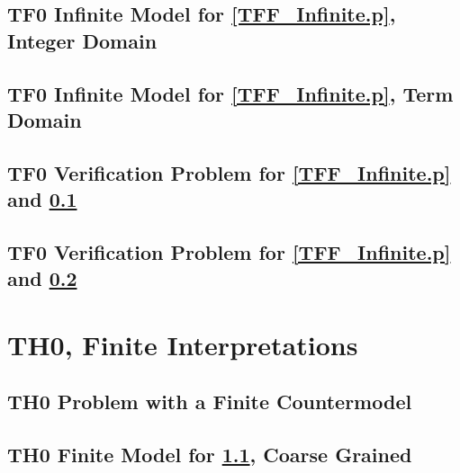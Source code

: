 \documentclass{easychair}
\begin{document}
\newpage
\subsection{TF0 Infinite Model for \ref{TFF_Infinite.p}, Integer Domain}
\label{TFF_Integer.s}
\begin{small}

\end{small}

\newpage
\subsection{TF0 Infinite Model for \ref{TFF_Infinite.p}, Term Domain}
\label{TFF_Peano.s}
\begin{small}

\end{small}

\newpage
\subsection{TF0 Verification Problem for \ref{TFF_Infinite.p} and \ref{TFF_Integer.s}}
\label{TFF_Integer.s.p}
\begin{small}

\end{small}

\newpage
\subsection{TF0 Verification Problem for \ref{TFF_Infinite.p} and \ref{TFF_Peano.s}}
\label{TFF_Peano.s.p}
\begin{small}

\end{small}

\newpage
\section{TH0, Finite Interpretations}
\label{TH0Finite}

\subsection{TH0 Problem with a Finite Countermodel}
\label{THF_Finite.p}
\begin{small}

\end{small}

\newpage
\subsection{TH0 Finite Model for \ref{THF_Finite.p}, Coarse Grained}
\label{THF_Finite.s}
\begin{small}

\end{small}
\end{document}
